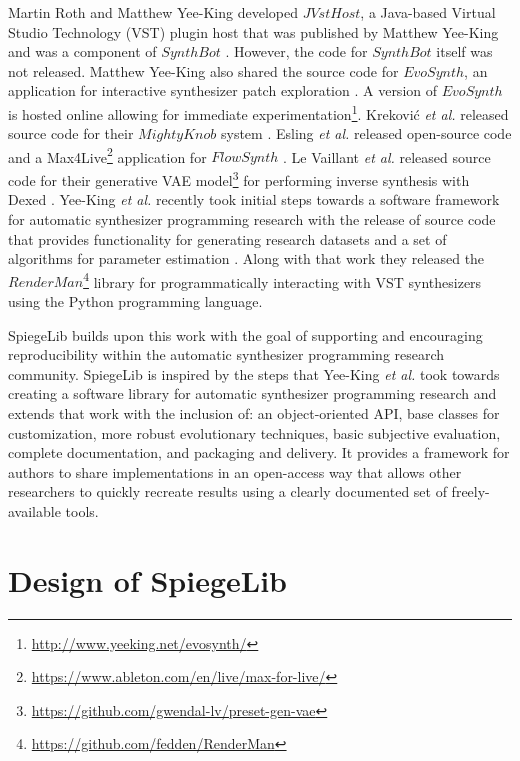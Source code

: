  Martin Roth and Matthew Yee-King developed $JVstHost$, a Java-based Virtual Studio Technology (VST) plugin host that was published by Matthew Yee-King \cite{yee2011automatic} and was a component of $SynthBot$ \cite{yee2008synthbot}. However, the code for $SynthBot$ itself was not released. Matthew Yee-King also shared the source code for $EvoSynth$, an application for interactive synthesizer patch exploration \cite{yee2016use}. A version of $EvoSynth$ is hosted online allowing for immediate experimentation\footnote{\url{http://www.yeeking.net/evosynth/}}. Krekovi{\'c} \textit{et al.} released source code for their $MightyKnob$ system \cite{krekovic2016algorithm}. Esling \textit{et al.} released open-source code and a Max4Live\footnote{\url{https://www.ableton.com/en/live/max-for-live/}} application for $FlowSynth$ \cite{esling2020flow}. Le Vaillant \textit{et al.} released source code for their generative VAE model\footnote{\url{https://github.com/gwendal-lv/preset-gen-vae}} for performing inverse synthesis with Dexed \cite{le2021improving}. Yee-King \textit{et al.} recently took initial steps towards a software framework for automatic synthesizer programming research with the release of source code that provides functionality for generating research datasets and a set of algorithms for parameter estimation \cite{yee2018automatic}. Along with that work they released the $RenderMan$\footnote{\url{https://github.com/fedden/RenderMan}} library for programmatically interacting with VST synthesizers using the Python programming language.
 
 SpiegeLib builds upon this work with the goal of supporting and encouraging reproducibility within the automatic synthesizer programming research community. SpiegeLib is inspired by the steps that Yee-King \textit{et al.} took towards creating a software library for automatic synthesizer programming research and extends that work with the inclusion of: an object-oriented API, base classes for customization, more robust evolutionary techniques, basic subjective evaluation, complete documentation, and packaging and delivery. It provides a framework for authors to share implementations in an open-access way that allows other researchers to quickly recreate results using a clearly documented set of freely-available tools.
 
\section{Design of SpiegeLib}
\label{chapter:inverse_synth;section:spiegelib}

